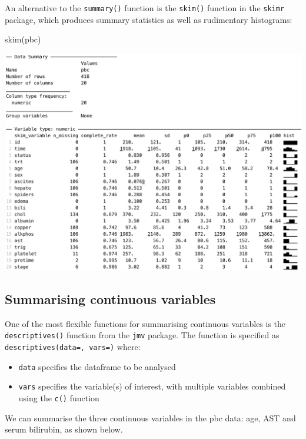 \documentclass[
]{memoir}
\newenvironment{Shaded}{\begin{snugshade}}{\end{snugshade}}
\newcommand{\FunctionTok}[1]{\textcolor[rgb]{0.00,0.00,0.00}{#1}}
\newcommand{\NormalTok}[1]{#1}
\providecommand{\tightlist}{%
  \setlength{\itemsep}{0pt}\setlength{\parskip}{0pt}}
\begin{document}
An alternative to the \texttt{summary()} function is the \texttt{skim()} function in the \texttt{skimr} package, which produces summary statistics as well as rudimentary histograms:

\begin{Shaded}
\begin{Highlighting}[]
\FunctionTok{skim}\NormalTok{(pbc)}
\end{Highlighting}
\end{Shaded}

\includegraphics[width=0.9\linewidth]{img/skim-pbc}

\hypertarget{summarising-continuous-variables}{%
\subsection{Summarising continuous variables}\label{summarising-continuous-variables}}

One of the most flexible functions for summarising continuous variables is the \texttt{descriptives()} function from the \texttt{jmv} package. The function is specified as \texttt{descriptives(data=,\ vars=)} where:

\begin{itemize}
\tightlist
\item
  \texttt{data} specifies the dataframe to be analysed
\item
  \texttt{vars} specifies the variable(s) of interest, with multiple variables combined using the \texttt{c()} function
\end{itemize}

We can summarise the three continuous variables in the pbc data: age, AST and serum bilirubin, as shown below.
\end{document}
